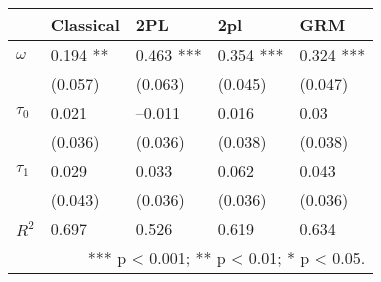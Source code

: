 \begin{tabular}{lllll}
  \hline
  & Classical & 2PL & 2pl & GRM \\ 
   \hline
$\omega$ & 0.194 ** & 0.463 *** & 0.354 *** & 0.324 *** \\ 
   & (0.057) & (0.063) & (0.045) & (0.047) \\ 
  $\tau_0$ & 0.021 & --0.011 & 0.016 & 0.03 \\ 
   & (0.036) & (0.036) & (0.038) & (0.038) \\ 
  $\tau_1$ & 0.029 & 0.033 & 0.062 & 0.043 \\ 
   & (0.043) & (0.036) & (0.036) & (0.036) \\ 
   \hline
$R^2$ & 0.697 & 0.526 & 0.619 & 0.634 \\ 
   \hline
\multicolumn{5}{r}{  *** p < 0.001;  ** p < 0.01;  * p < 0.05. } &  &  &  &  \\ 
  \end{tabular}
